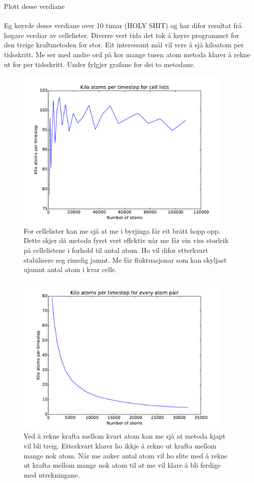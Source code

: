 \documentclass[12pt, a4paper]{article}
\theoremstyle{definition} \newtheorem*{definition}{Teorem}
\begin{document}
        Plott desse verdiane \\ \\
        Eg køyrde desse verdiane over 10 timar (HOLY SHIT) og har difor resultat frå høgare verdiar av cellelister. Diverre vert tida det tok å køyre programmet for den treige kraftmetoden
        for stor. Eit interessant mål vil vere å sjå kiloatom per tidsskritt. Me ser med andre ord på kor mange tusen atom metoda klarer å rekne ut for per tidsskritt. Under 
        fylgjer grafane for dei to metodane.

        \begin{figure}[H]
            \centering
            \includegraphics[width=400px]{cellLists.pdf}
            \caption{For cellelister kan me sjå at me i byrjinga får eit brått hopp opp. Dette skjer då metoda fyrst vert effektiv når me får ein viss storleik på cellelistene
                     i forhold til antal atom. Ho vil difor etterkvart stabilisere seg rimelig jamnt. Me får fluktuasjonar som kan skyljast ujamnt antal atom i kvar celle.}
        \end{figure}
        \begin{figure}[H]
            \centering
            \includegraphics[width=400px]{oldForce.pdf}
            \caption{Ved å rekne krafta mellom kvart atom kan me sjå at metoda kjapt vil bli treig. Etterkvart klarer ho ikkje å rekne ut krafta mellom mange nok atom. Når me auker
                     antal atom vil ho slite med å rekne ut krafta mellom mange nok atom til at me vil klare å bli ferdige med utrekningane.}
        \end{figure}
\end{document}
